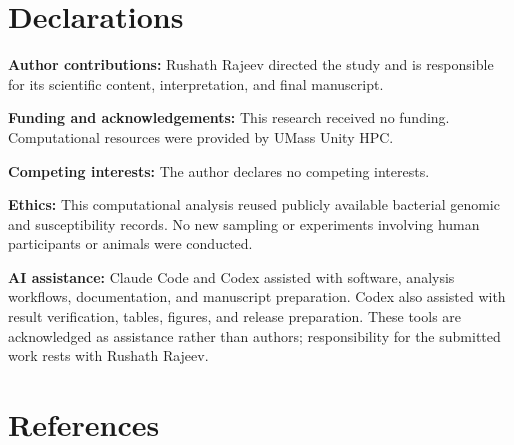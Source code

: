 \documentclass[
  american,
  11pt,
]{article}
\begin{document}
\section{Declarations}\label{declarations}

\textbf{Author contributions:} Rushath Rajeev directed the study and is
responsible for its scientific content, interpretation, and final
manuscript.

\textbf{Funding and acknowledgements:} This research received no
funding. Computational resources were provided by UMass Unity HPC.

\textbf{Competing interests:} The author declares no competing
interests.

\textbf{Ethics:} This computational analysis reused publicly available
bacterial genomic and susceptibility records. No new sampling or
experiments involving human participants or animals were conducted.

\textbf{AI assistance:} Claude Code and Codex assisted with software,
analysis workflows, documentation, and manuscript preparation. Codex
also assisted with result verification, tables, figures, and release
preparation. These tools are acknowledged as assistance rather than
authors; responsibility for the submitted work rests with Rushath
Rajeev.

\section*{References}\label{references}
\end{document}
